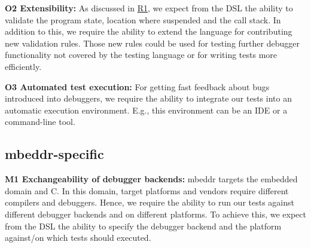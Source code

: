 \noindent \textbf{\label{O2}O2 Extensibility:} As discussed in
\hyperref[R1]{R1}, 
we expect from the \ac{DSL} the ability to validate the program state, location
where suspended and the call stack. In addition to this, we
require the ability to extend the language for contributing new
validation rules. Those new rules could be used for testing further debugger
functionality not covered by the testing language or for writing tests more
efficiently.

\noindent \textbf{\label{O3}O3 Automated test execution:} For getting fast
feedback about bugs introduced into debuggers, 
we require the ability to integrate our 
tests into an automatic execution environment. E.g., this environment can be
an \ac{IDE} or a command-line tool. 

\subsection{mbeddr-specific}
\noindent \textbf{\label{M1}M1 Exchangeability of debugger backends:}
mbeddr targets the embedded domain and C. In this domain, target platforms and
vendors require different compilers and debuggers. 
Hence, we require the ability to run our tests against
different debugger backends and on different platforms. To achieve this,
we expect from the \ac{DSL} the ability to specify the debugger backend
and the platform against/on which tests should executed.

